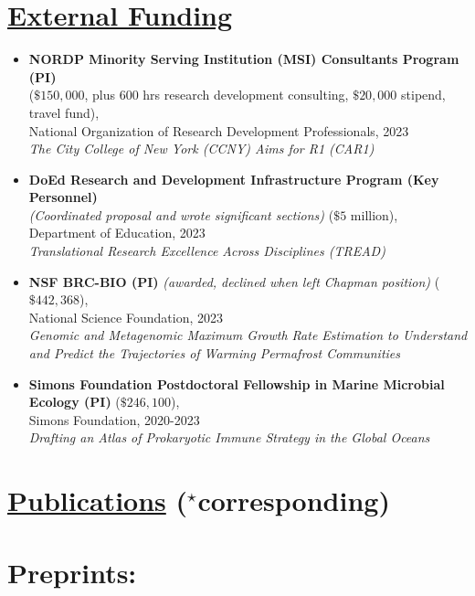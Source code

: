 \documentclass[]{res}
\begin{document}
\begin{resume}
\section{\underline{External Funding}} %
\begin{itemize} 
\item[] {\bf NORDP Minority Serving Institution (MSI) Consultants Program (PI)}\\ ($\$150,000$, plus 600 hrs research development consulting, $\$20,000$ stipend, travel fund),\\ National Organization of Research Development Professionals, 2023\\\emph{The City College of New York (CCNY) Aims for R1 (CAR1)}\\
\item[] {\bf DoEd Research and Development Infrastructure Program (Key Personnel)}\\ \emph{(Coordinated proposal and wrote significant sections)} ($\$5$ million),\\ Department of Education, 2023\\\emph{Translational Research Excellence Across Disciplines (TREAD)}\\
\item[] {\bf NSF BRC-BIO (PI)} \emph{(awarded, declined when left Chapman position)} ($\$442,368$),\\ National Science Foundation, 2023\\\emph{Genomic and Metagenomic Maximum Growth Rate Estimation to Understand and Predict the Trajectories of Warming Permafrost Communities}\\
\item[] {\bf Simons Foundation Postdoctoral Fellowship in Marine Microbial Ecology (PI)} ($\$246,100$),\\ Simons Foundation, 2020-2023\\\emph{Drafting an Atlas of Prokaryotic Immune Strategy in the Global Oceans}
\end{itemize} 

 
 \section{\underline{Publications} ($^\star$corresponding)} \vspace{2mm}
 
 
 \section{Preprints:} \vspace{0mm}
  

\end{resume}
\end{document}
